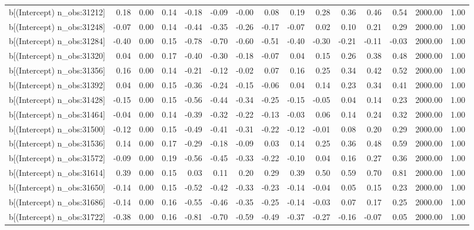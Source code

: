 \begin{table}[ht]
\begin{tabular}{rrrrrrrrrrrrrrr}
  b[(Intercept) n\_obs:31212] & 0.18 & 0.00 & 0.14 & -0.18 & -0.09 & -0.00 & 0.08 & 0.19 & 0.28 & 0.36 & 0.46 & 0.54 & 2000.00 & 1.00 \\ 
  b[(Intercept) n\_obs:31248] & -0.07 & 0.00 & 0.14 & -0.44 & -0.35 & -0.26 & -0.17 & -0.07 & 0.02 & 0.10 & 0.21 & 0.29 & 2000.00 & 1.00 \\ 
  b[(Intercept) n\_obs:31284] & -0.40 & 0.00 & 0.15 & -0.78 & -0.70 & -0.60 & -0.51 & -0.40 & -0.30 & -0.21 & -0.11 & -0.03 & 2000.00 & 1.00 \\ 
  b[(Intercept) n\_obs:31320] & 0.04 & 0.00 & 0.17 & -0.40 & -0.30 & -0.18 & -0.07 & 0.04 & 0.15 & 0.26 & 0.38 & 0.48 & 2000.00 & 1.00 \\ 
  b[(Intercept) n\_obs:31356] & 0.16 & 0.00 & 0.14 & -0.21 & -0.12 & -0.02 & 0.07 & 0.16 & 0.25 & 0.34 & 0.42 & 0.52 & 2000.00 & 1.00 \\ 
  b[(Intercept) n\_obs:31392] & 0.04 & 0.00 & 0.15 & -0.36 & -0.24 & -0.15 & -0.06 & 0.04 & 0.14 & 0.23 & 0.34 & 0.41 & 2000.00 & 1.00 \\ 
  b[(Intercept) n\_obs:31428] & -0.15 & 0.00 & 0.15 & -0.56 & -0.44 & -0.34 & -0.25 & -0.15 & -0.05 & 0.04 & 0.14 & 0.23 & 2000.00 & 1.00 \\ 
  b[(Intercept) n\_obs:31464] & -0.04 & 0.00 & 0.14 & -0.39 & -0.32 & -0.22 & -0.13 & -0.03 & 0.06 & 0.14 & 0.24 & 0.32 & 2000.00 & 1.00 \\ 
  b[(Intercept) n\_obs:31500] & -0.12 & 0.00 & 0.15 & -0.49 & -0.41 & -0.31 & -0.22 & -0.12 & -0.01 & 0.08 & 0.20 & 0.29 & 2000.00 & 1.00 \\ 
  b[(Intercept) n\_obs:31536] & 0.14 & 0.00 & 0.17 & -0.29 & -0.18 & -0.09 & 0.03 & 0.14 & 0.25 & 0.36 & 0.48 & 0.59 & 2000.00 & 1.00 \\ 
  b[(Intercept) n\_obs:31572] & -0.09 & 0.00 & 0.19 & -0.56 & -0.45 & -0.33 & -0.22 & -0.10 & 0.04 & 0.16 & 0.27 & 0.36 & 2000.00 & 1.00 \\ 
  b[(Intercept) n\_obs:31614] & 0.39 & 0.00 & 0.15 & 0.03 & 0.11 & 0.20 & 0.29 & 0.39 & 0.50 & 0.59 & 0.70 & 0.81 & 2000.00 & 1.00 \\ 
  b[(Intercept) n\_obs:31650] & -0.14 & 0.00 & 0.15 & -0.52 & -0.42 & -0.33 & -0.23 & -0.14 & -0.04 & 0.05 & 0.15 & 0.23 & 2000.00 & 1.00 \\ 
  b[(Intercept) n\_obs:31686] & -0.14 & 0.00 & 0.16 & -0.55 & -0.46 & -0.35 & -0.25 & -0.14 & -0.03 & 0.07 & 0.17 & 0.25 & 2000.00 & 1.00 \\ 
  b[(Intercept) n\_obs:31722] & -0.38 & 0.00 & 0.16 & -0.81 & -0.70 & -0.59 & -0.49 & -0.37 & -0.27 & -0.16 & -0.07 & 0.05 & 2000.00 & 1.00 \\ 

\end{tabular}
\end{table}
